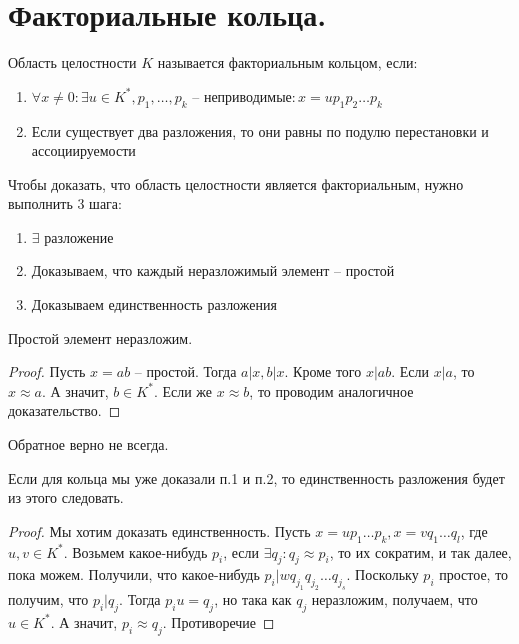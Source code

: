 \documentclass[document.tex]{subfiles}
\begin{document}
\section{Факториальные кольца.}
\begin{definition}
	Область целостности $K$ называется факториальным кольцом, если:
	\begin{enumerate}
		\item $\forall x \neq 0: \exists u \in K^*, p_1, \ldots, p_k \text{ -- неприводимые} : x = up_1p_2 \ldots p_k$
		\item Если существует два разложения, то они равны по подулю перестановки и ассоциируемости
	\end{enumerate}
\end{definition}

\begin{remark}
	Чтобы доказать, что область целостности является факториальным, нужно выполнить 3 шага:
	\begin{enumerate}
		\item $\exists$ разложение
		\item Доказываем, что каждый неразложимый элемент -- простой
		\item Доказываем единственность разложения
	\end{enumerate}
\end{remark}

\begin{statement}
	Простой элемент неразложим.
\end{statement}

\begin{proof}
	Пусть $x = ab$ -- простой. Тогда $a|x, b|x$. Кроме того $x | ab$. Если $x|a$, то $x \approx a$. А значит, $b \in K^*$. Если же $x \approx b$, то проводим аналогичное доказательство. 
\end{proof}

\begin{remark}
	Обратное верно не всегда.
\end{remark}

\begin{statement}
	Если для кольца мы уже доказали п.1 и п.2, то единственность разложения будет из этого следовать.
\end{statement}

\begin{proof}
	Мы хотим доказать единственность. Пусть $x = up_1 \ldots p_k, x = vq_1 \ldots q_l$, где $u, v \in K^*$. Возьмем какое-нибудь $p_i$, если $\exists q_j: q_j \approx p_i$, то их сократим, и так далее, пока можем. Получили, что какое-нибудь $p_i | w q_{j_1} q_{j_2} \ldots q_{j_s}$. Поскольку $p_i$ простое, то получим, что $p_i | q_j$. Тогда $p_i u = q_j$, но така как $q_j$ неразложим, получаем, что $u \in K^*$. А значит, $p_i \approx q_j$. Противоречие
\end{proof}
\end{document}
